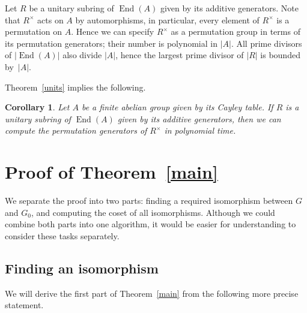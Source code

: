 \documentclass{article}
\newtheorem{corollary}[theorem]{Corollary}
\DeclareMathOperator{\End}{End}
\begin{document}
Let \( R \) be a unitary subring of \( \End(A) \) given by its additive generators.
Note that \( R^\times \) acts on \( A \) by automorphisms, in particular, every element of \( R^\times \) is a permutation on \( A \).
Hence we can specify \( R^\times \) as a permutation group in terms of its permutation generators; their number is polynomial in \( |A| \).
All prime divisors of \( |\End(A)| \) also divide \( |A| \), hence the largest prime divisor of \( |R| \) is bounded by~\( |A| \).

Theorem~\ref{units} implies the following.

\begin{corollary}\label{cunits}
	Let \( A \) be a finite abelian group given by its Cayley table. If \( R \) is a unitary subring of \( \End(A) \) given by its additive generators,
	then we can compute the permutation generators of \( R^\times \) in polynomial time.
\end{corollary}

\section{Proof of Theorem~\ref{main}}\label{sproof}

We separate the proof into two parts: finding a required isomorphism between \( G \) and \( G_0 \), and computing the coset of all isomorphisms.
Although we could combine both parts into one algorithm, it would be easier for understanding to consider these tasks separately.

\subsection{Finding an isomorphism}\label{findiso}

We will derive the first part of Theorem~\ref{main} from the following more precise statement.
\end{document}

